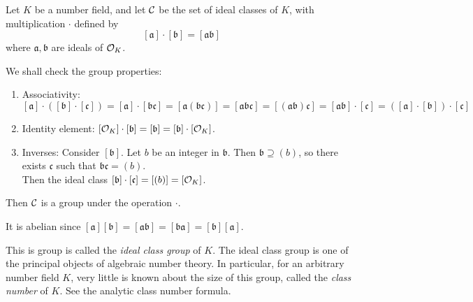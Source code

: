\documentclass[12pt]{article}
\begin{document}
Let $K$ be a number field, and let $\cal C$ be the set of ideal classes of $K$, with multiplication $\cdot$ defined by \[ [\mathfrak{a}] \cdot [\mathfrak{b}]=[\mathfrak{a} \mathfrak{b}] \]
where $\mathfrak{a}, \mathfrak{b}$ are ideals of ${\cal{O}}_K$.

We shall check the group properties:

\begin{enumerate}
\item Associativity: $[\mathfrak{a}] \cdot ([\mathfrak{b}] \cdot [\mathfrak{c}])=
                      [\mathfrak{a}] \cdot [\mathfrak{b}\mathfrak{c}]=
                      [\mathfrak{a}(\mathfrak{b}\mathfrak{c})]=
                      [\mathfrak{a}\mathfrak{b}\mathfrak{c}]=
                      [(\mathfrak{a}\mathfrak{b})\mathfrak{c}]=
                      [\mathfrak{a}\mathfrak{b}] \cdot [\mathfrak{c}]=
                      ([\mathfrak{a}] \cdot [\mathfrak{b}]) \cdot [\mathfrak{c}]$
\item Identity element: $[ {\cal{O}}_K ] \cdot [\mathfrak{b}]=
[\mathfrak{b}]=[\mathfrak{b}] \cdot [ {\cal{O}}_K ]$.
\item Inverses: Consider $[\mathfrak{b}]$.  Let $b$ be an integer in $\mathfrak{b}$.  Then
         $\mathfrak{b} \supseteq (b)$, so there exists $\mathfrak{c}$
         such that $\mathfrak{b}\mathfrak{c}=(b)$.\\
         Then the ideal class $[\mathfrak{b}] \cdot [\mathfrak{c}] = [(b)]=[ {\cal{O}}_K ]$.
\end{enumerate}
Then ${\cal C}$ is a group under the operation $\cdot$.

It is abelian since $[\mathfrak{a}][\mathfrak{b}]=[\mathfrak{a}\mathfrak{b}]=
[\mathfrak{b}\mathfrak{a}]=[\mathfrak{b}][\mathfrak{a}]$.

This is group is called the \emph{ideal class group} of $K$.  The ideal class group is one of the principal objects of algebraic number theory.  In particular, for an arbitrary number field $K$, very little is known about the size of this group, called the \emph{class number} of $K$. See the analytic class number formula.
\end{document}
